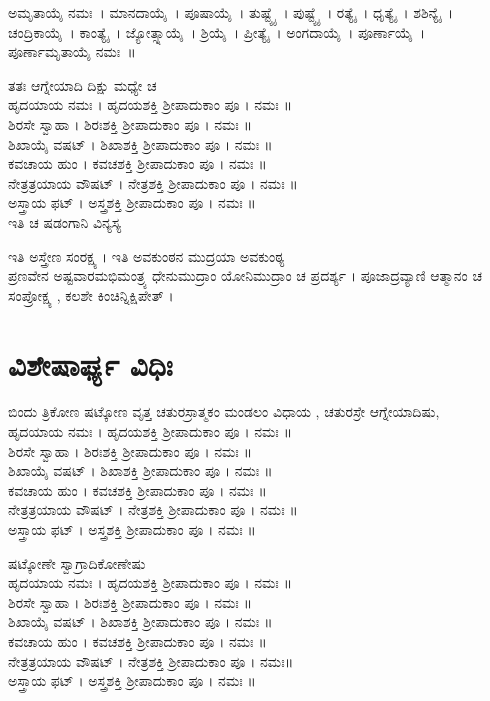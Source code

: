  ಅಮೃತಾಯೈ ನಮಃ~।  ಮಾನದಾಯೈ~।  ಪೂಷಾಯೈ~।  ತುಷ್ಟ್ಯೈ~।  ಪುಷ್ಟ್ಯೈ~।  ರತ್ಯೈ~।  ಧೃತ್ಯೈ~।  ಶಶಿನ್ಯೈ~।  ಚಂದ್ರಿಕಾಯೈ~।  ಕಾಂತ್ಯೈ~।  ಜ್ಯೋತ್ಸ್ನಾಯೈ~।  ಶ್ರಿಯೈ~।  ಪ್ರೀತ್ಯೈ~।  ಅಂಗದಾಯೈ~।  ಪೂರ್ಣಾಯೈ~।  ಪೂರ್ಣಾಮೃತಾಯೈ ನಮಃ~॥

ತತಃ ಆಗ್ನೇಯಾದಿ ದಿಕ್ಷು ಮಧ್ಯೇ ಚ \\
 ಹೃದಯಾಯ ನಮಃ । ಹೃದಯಶಕ್ತಿ ಶ್ರೀಪಾದುಕಾಂ ಪೂ । ನಮಃ ॥\\
 ಶಿರಸೇ ಸ್ವಾಹಾ । ಶಿರಃಶಕ್ತಿ ಶ್ರೀಪಾದುಕಾಂ ಪೂ । ನಮಃ ॥\\
 ಶಿಖಾಯೈ ವಷಟ್ । ಶಿಖಾಶಕ್ತಿ ಶ್ರೀಪಾದುಕಾಂ ಪೂ । ನಮಃ ॥\\
 ಕವಚಾಯ ಹುಂ । ಕವಚಶಕ್ತಿ ಶ್ರೀಪಾದುಕಾಂ ಪೂ । ನಮಃ ॥\\
 ನೇತ್ರತ್ರಯಾಯ ವೌಷಟ್ । ನೇತ್ರಶಕ್ತಿ ಶ್ರೀಪಾದುಕಾಂ ಪೂ । ನಮಃ ॥\\
 ಅಸ್ತ್ರಾಯ ಫಟ್ । ಅಸ್ತ್ರಶಕ್ತಿ ಶ್ರೀಪಾದುಕಾಂ ಪೂ । ನಮಃ ॥\\
ಇತಿ ಚ ಷಡಂಗಾನಿ ವಿನ್ಯಸ್ಯ

 ಇತಿ ಅಸ್ತ್ರೇಣ ಸಂರಕ್ಷ್ಯ ।  ಇತಿ ಅವಕುಂಠನ ಮುದ್ರಯಾ ಅವಕುಂಠ್ಯ\\
ಪ್ರಣವೇನ ಅಷ್ಟವಾರಮಭಿಮಂತ್ರ್ಯ ಧೇನುಮುದ್ರಾಂ ಯೋನಿಮುದ್ರಾಂ ಚ ಪ್ರದರ್ಶ್ಯ ।  ಪೂಜಾದ್ರವ್ಯಾಣಿ ಆತ್ಮಾನಂ ಚ ಸಂಪ್ರೋಕ್ಷ್ಯ , ಕಲಶೇ ಕಿಂಚಿನ್ನಿಕ್ಷಿಪೇತ್ ।

\section{ವಿಶೇಷಾರ್ಘ್ಯ ವಿಧಿಃ}
ಬಿಂದು ತ್ರಿಕೋಣ ಷಟ್ಕೋಣ ವೃತ್ತ ಚತುರಸ್ರಾತ್ಮಕಂ ಮಂಡಲಂ ವಿಧಾಯ , ಚತುರಸ್ರೇ ಆಗ್ನೇಯಾದಿಷು,\\
 ಹೃದಯಾಯ ನಮಃ । ಹೃದಯಶಕ್ತಿ ಶ್ರೀಪಾದುಕಾಂ ಪೂ । ನಮಃ ॥\\
 ಶಿರಸೇ ಸ್ವಾಹಾ । ಶಿರಃಶಕ್ತಿ ಶ್ರೀಪಾದುಕಾಂ ಪೂ । ನಮಃ ॥\\
 ಶಿಖಾಯೈ ವಷಟ್ । ಶಿಖಾಶಕ್ತಿ ಶ್ರೀಪಾದುಕಾಂ ಪೂ । ನಮಃ ॥\\
 ಕವಚಾಯ ಹುಂ । ಕವಚಶಕ್ತಿ ಶ್ರೀಪಾದುಕಾಂ ಪೂ । ನಮಃ ॥\\
 ನೇತ್ರತ್ರಯಾಯ ವೌಷಟ್ । ನೇತ್ರಶಕ್ತಿ ಶ್ರೀಪಾದುಕಾಂ ಪೂ । ನಮಃ ॥\\
 ಅಸ್ತ್ರಾಯ ಫಟ್ । ಅಸ್ತ್ರಶಕ್ತಿ ಶ್ರೀಪಾದುಕಾಂ ಪೂ । ನಮಃ ॥

ಷಟ್ಕೋಣೇ ಸ್ವಾಗ್ರಾದಿಕೋಣೇಷು\\
 ಹೃದಯಾಯ ನಮಃ । ಹೃದಯಶಕ್ತಿ ಶ್ರೀಪಾದುಕಾಂ ಪೂ । ನಮಃ ॥\\
 ಶಿರಸೇ ಸ್ವಾಹಾ । ಶಿರಃಶಕ್ತಿ ಶ್ರೀಪಾದುಕಾಂ ಪೂ । ನಮಃ ॥\\
 ಶಿಖಾಯೈ ವಷಟ್ । ಶಿಖಾಶಕ್ತಿ ಶ್ರೀಪಾದುಕಾಂ ಪೂ । ನಮಃ ॥\\
 ಕವಚಾಯ ಹುಂ । ಕವಚಶಕ್ತಿ ಶ್ರೀಪಾದುಕಾಂ ಪೂ । ನಮಃ ॥\\
 ನೇತ್ರತ್ರಯಾಯ ವೌಷಟ್ । ನೇತ್ರಶಕ್ತಿ ಶ್ರೀಪಾದುಕಾಂ ಪೂ । ನಮಃ॥\\
 ಅಸ್ತ್ರಾಯ ಫಟ್ । ಅಸ್ತ್ರಶಕ್ತಿ ಶ್ರೀಪಾದುಕಾಂ ಪೂ । ನಮಃ ॥

